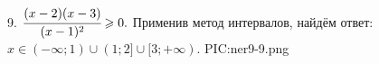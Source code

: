 9. $\cfrac{(x-2)(x-3)}{(x-1)^2}\geqslant0.$ Применив метод интервалов, найдём ответ: $x\in(-\infty;1)\cup(1;2]\cup[3;+\infty).$
{{PIC:ner9-9.png}}\\

